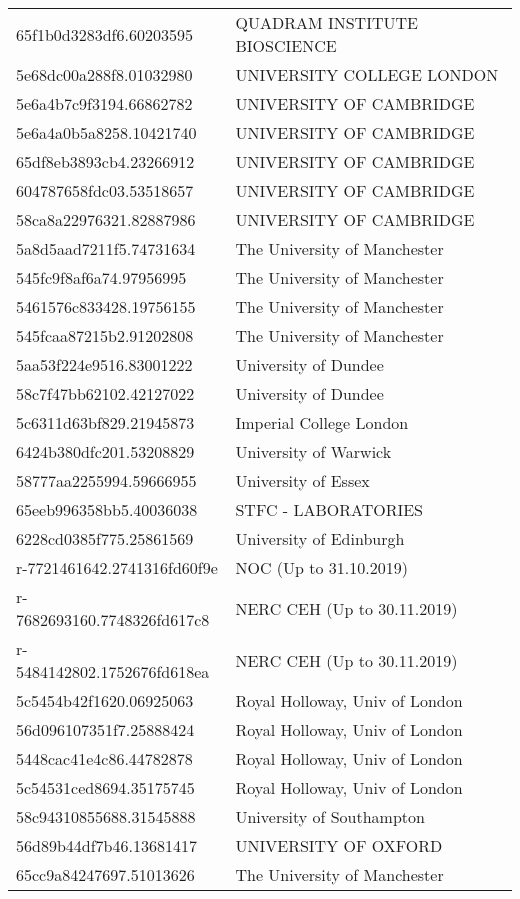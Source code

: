 \begin{tabular}{ll}
65f1b0d3283df6.60203595 & QUADRAM INSTITUTE BIOSCIENCE \\
5e68dc00a288f8.01032980 & UNIVERSITY COLLEGE LONDON \\
5e6a4b7c9f3194.66862782 & UNIVERSITY OF CAMBRIDGE \\
5e6a4a0b5a8258.10421740 & UNIVERSITY OF CAMBRIDGE \\
65df8eb3893cb4.23266912 & UNIVERSITY OF CAMBRIDGE \\
604787658fdc03.53518657 & UNIVERSITY OF CAMBRIDGE \\
58ca8a22976321.82887986 & UNIVERSITY OF CAMBRIDGE \\
5a8d5aad7211f5.74731634 & The University of Manchester \\
545fc9f8af6a74.97956995 & The University of Manchester \\
5461576c833428.19756155 & The University of Manchester \\
545fcaa87215b2.91202808 & The University of Manchester \\
5aa53f224e9516.83001222 & University of Dundee \\
58c7f47bb62102.42127022 & University of Dundee \\
5c6311d63bf829.21945873 & Imperial College London \\
6424b380dfc201.53208829 & University of Warwick \\
58777aa2255994.59666955 & University of Essex \\
65eeb996358bb5.40036038 & STFC - LABORATORIES \\
6228cd0385f775.25861569 & University of Edinburgh \\
r-7721461642.2741316fd60f9e & NOC (Up to 31.10.2019) \\
r-7682693160.7748326fd617c8 & NERC CEH (Up to 30.11.2019) \\
r-5484142802.1752676fd618ea & NERC CEH (Up to 30.11.2019) \\
5c5454b42f1620.06925063 & Royal Holloway, Univ of London \\
56d096107351f7.25888424 & Royal Holloway, Univ of London \\
5448cac41e4c86.44782878 & Royal Holloway, Univ of London \\
5c54531ced8694.35175745 & Royal Holloway, Univ of London \\
58c94310855688.31545888 & University of Southampton \\
56d89b44df7b46.13681417 & UNIVERSITY OF OXFORD \\
65cc9a84247697.51013626 & The University of Manchester \\

\end{tabular}
